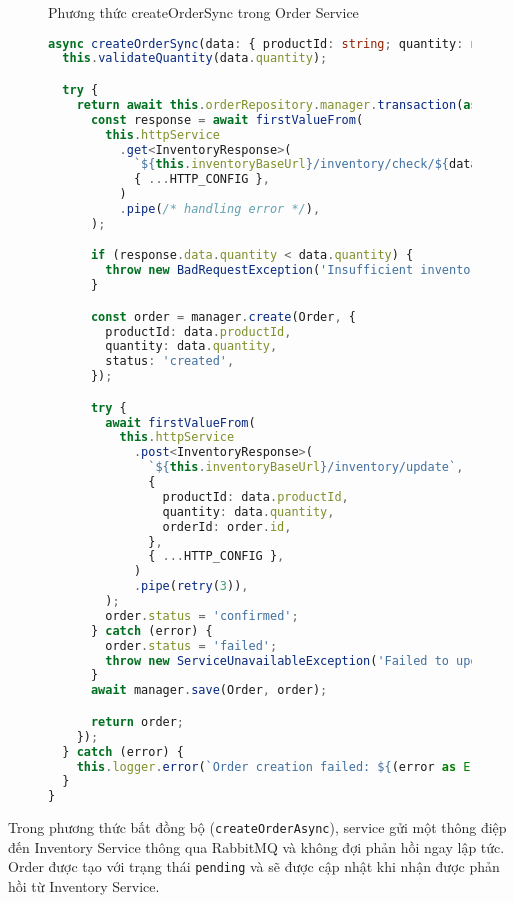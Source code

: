 \begin{figure}[H]{Phương thức createOrderSync trong Order Service}
  \centering
  \begin{minipage}{\textwidth}
    \begin{lstlisting}[language=Typescript, basicstyle=\scriptsize\ttfamily]
async createOrderSync(data: { productId: string; quantity: number }) {
  this.validateQuantity(data.quantity);

  try {
    return await this.orderRepository.manager.transaction(async (manager) => {
      const response = await firstValueFrom(
        this.httpService
          .get<InventoryResponse>(
            `${this.inventoryBaseUrl}/inventory/check/${data.productId}`,
            { ...HTTP_CONFIG },
          )
          .pipe(/* handling error */),
      );

      if (response.data.quantity < data.quantity) {
        throw new BadRequestException('Insufficient inventory');
      }

      const order = manager.create(Order, {
        productId: data.productId,
        quantity: data.quantity,
        status: 'created',
      });

      try {
        await firstValueFrom(
          this.httpService
            .post<InventoryResponse>(
              `${this.inventoryBaseUrl}/inventory/update`,
              {
                productId: data.productId,
                quantity: data.quantity,
                orderId: order.id,
              },
              { ...HTTP_CONFIG },
            )
            .pipe(retry(3)),
        );
        order.status = 'confirmed';
      } catch (error) {
        order.status = 'failed';
        throw new ServiceUnavailableException('Failed to update inventory');
      }
      await manager.save(Order, order);

      return order;
    });
  } catch (error) {
    this.logger.error(`Order creation failed: ${(error as Error).message}`);
  }
}
\end{lstlisting}
  \end{minipage}
\end{figure}

Trong phương thức bất đồng bộ (\texttt{createOrderAsync}), service gửi một thông điệp đến Inventory Service thông qua RabbitMQ và không đợi phản hồi ngay lập tức. Order được tạo với trạng thái \texttt{pending} và sẽ được cập nhật khi nhận được phản hồi từ Inventory Service.

